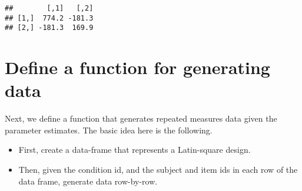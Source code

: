 \documentclass[12pt,]{krantz}
\newenvironment{Shaded}{\begin{snugshade}}{\end{snugshade}}
\newcommand{\CommentTok}[1]{\textcolor[rgb]{0.56,0.35,0.01}{\textit{#1}}}
\newcommand{\DataTypeTok}[1]{\textcolor[rgb]{0.13,0.29,0.53}{#1}}
\newcommand{\DecValTok}[1]{\textcolor[rgb]{0.00,0.00,0.81}{#1}}
\newcommand{\KeywordTok}[1]{\textcolor[rgb]{0.13,0.29,0.53}{\textbf{#1}}}
\newcommand{\NormalTok}[1]{#1}
\newcommand{\OperatorTok}[1]{\textcolor[rgb]{0.81,0.36,0.00}{\textbf{#1}}}
\newcommand{\StringTok}[1]{\textcolor[rgb]{0.31,0.60,0.02}{#1}}
\providecommand{\tightlist}{%
  \setlength{\itemsep}{0pt}\setlength{\parskip}{0pt}}
\begin{document}
\begin{Shaded}
\end{Shaded}

\begin{verbatim}
##        [,1]   [,2]
## [1,]  774.2 -181.3
## [2,] -181.3  169.9
\end{verbatim}

\hypertarget{define-a-function-for-generating-data}{%
\section{Define a function for generating data}\label{define-a-function-for-generating-data}}

Next, we define a function that generates repeated measures data given the parameter estimates. The basic idea here is the following.

\begin{itemize}
\tightlist
\item
  First, create a data-frame that represents a Latin-square design.
\item
  Then, given the condition id, and the subject and item ids in each row of the data frame, generate data row-by-row.
\end{itemize}
\end{document}
